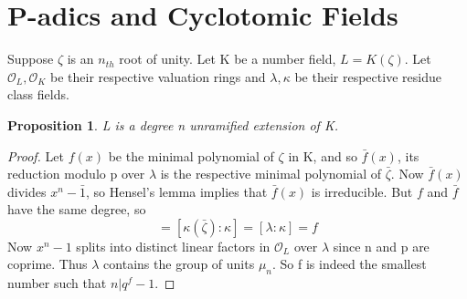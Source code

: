 \documentclass[preprint,12pt,reqno]{elsarticle}
\newtheorem{proposition}{Proposition}
\begin{document}
\section{P-adics and Cyclotomic Fields}
Suppose $\zeta$ is an $n_{th}$ root of unity. Let K be a number field, $L=K(\zeta)$. Let $\mathcal{O}_L,\mathcal{O}_K$ be their respective valuation rings and $\lambda,\kappa$ be their respective residue class fields. \begin{proposition}
L is a degree n unramified extension of K.
\end{proposition}
\begin{proof}
Let $f(x)$ be the minimal polynomial of $\zeta$ in K, and so $\bar{f}(x)$, its reduction modulo p over $\lambda$ is the respective minimal polynomial of $\bar{\zeta}$. Now $\bar{f}(x)$ divides $x^n-\bar{1}$, so Hensel's lemma implies that $\bar{f}(x)$ is irreducible. But $f$ and $\bar{f}$ have the same degree, so \begin{equation}
    [L:K]=[\kappa(\bar{\zeta}):\kappa]=[\lambda:\kappa]=f
\end{equation}
Now $x^n-1$ splits into distinct linear factors in $\mathcal{O}_L$ over $\lambda$ since n and p are coprime. Thus $\lambda$ contains the group of units $\mu_n$. So f is indeed the smallest number such that $n|q^f-1$. 
\end{proof}
\end{document}
